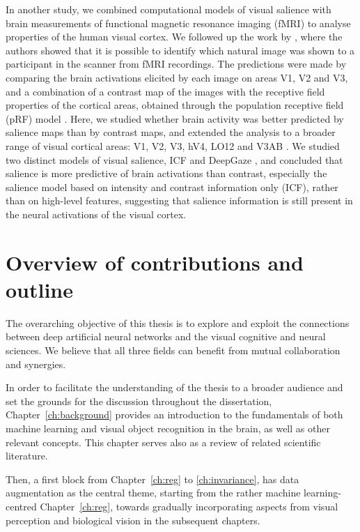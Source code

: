 {In another study, we combined computational models of visual salience with brain measurements of functional magnetic resonance imaging (fMRI) to analyse properties of the human visual cortex. We followed up the work by \citet{zuiderbaan2017imageidentification}, where the authors showed that it is possible to identify which natural image was shown to a participant in the scanner from fMRI recordings. The predictions were made by comparing the brain activations elicited by each image on areas V1, V2 and V3, and a combination of a contrast map of the images with the receptive field properties of the cortical areas, obtained through the population receptive field (pRF) model \citep{dumoulin2008prf}. Here, we studied whether brain activity was better predicted by salience maps than by contrast maps, and extended the analysis to a broader range of visual cortical areas: V1, V2, V3, hV4, LO12 and V3AB \citep{wandell2007visualfield}. We studied two distinct models of visual salience, ICF and DeepGaze \citep{kuemmerer2017icfdeepgaze}, and concluded that salience is more predictive of brain activations than contrast, especially the salience model based on intensity and contrast information only (ICF), rather than on high-level features, suggesting that salience information is still present in the neural activations of the visual cortex.

\section{Overview of contributions and outline}
\label{sec:intro-contributions}
The overarching objective of this thesis is to explore and exploit the connections between deep artificial neural networks and the visual cognitive and neural sciences. We believe that all three fields can benefit from mutual collaboration and synergies.

In order to facilitate the understanding of the thesis to a broader audience and set the grounds for the discussion throughout the dissertation, Chapter~\ref{ch:background} provides an introduction to the fundamentals of both machine learning and visual object recognition in the brain, as well as other relevant concepts. This chapter serves also as a review of related scientific literature.

Then, a first block from Chapter~\ref{ch:reg} to \ref{ch:invariance}, has data augmentation as the central theme, starting from the rather machine learning-centred Chapter~\ref{ch:reg}, towards gradually incorporating aspects from visual perception and biological vision in the subsequent chapters.

}
